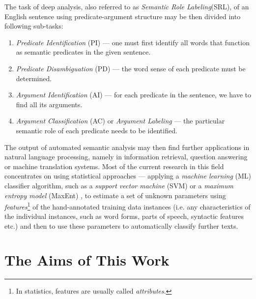 \documentclass[12pt,notitlepage]{report}
\begin{document}
The task of deep analysis, also referred to as \emph{Semantic Role Labeling}(SRL), of an English sentence using predicate-argument structure may be then divided into following sub-tasks:
\begin{enumerate}
    \item \emph{Predicate Identification} (PI) --- one must first identify all words that function as semantic predicates in the given sentence.
    \item \emph{Predicate Disambiguation} (PD) --- the word sense of each predicate must be determined.
    \item \emph{Argument Identification}  (AI) --- for each predicate in the sentence, we have to find all its arguments.
    \item \emph{Argument Classification} (AC) or \emph{Argument Labeling} --- the particular semantic role of each predicate needs to be identified.
\end{enumerate}

The output of automated semantic analysis may then find further applications in natural language processing, namely in information retrieval, question answering or machine translation systems. Most of the current research in this field concentrates on using statistical approaches --- applying a \emph{machine learning} (ML) classifier algorithm, such as a \emph{support vector machine} (SVM) \citep{boser92} or a \emph{maximum entropy model} (MaxEnt) \citep{jelinek97}, to estimate a set of unknown parameters using \emph{features}\footnote{In statistics, features are usually called \emph{attributes}.} of the hand-annotated training data instances (i.e. any characteristics of the individual instances, such as word forms, parts of speech, syntactic features etc.) and then to use these parameters to automatically classify further texts.

\section{The Aims of This Work}\label{aims}
\end{document}

